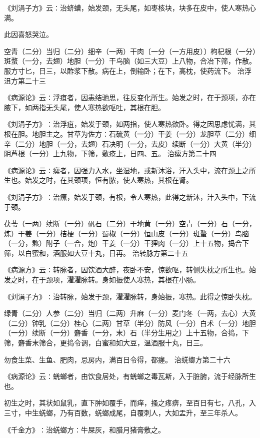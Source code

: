 \documentclass[a4paper,12pt,UTF8,twoside]{ctexbook}
\begin{document}
《刘涓子方》云∶治蛴螬，始发颈，无头尾，如枣核块，块多在皮中，使人寒热心满。

此因喜怒哭泣。

空青（二分）当归（二分）细辛（一两）干肉〔一分（一方用皮）〕枸杞根（一分）斑蝥（一分，去翅）地胆（一分）干鸟脑（如三大豆）上八物，合冶下筛，作散。服方寸匕，日三，以酢浆下散。病在上，倒输卧；在下，高枕，使药流下。
治浮沮方第二十三

《病源论》云∶浮疽者，因恚结驰思，往反变化所生。始发之时，在于颈项，亦在腋下，如两指无头尾，使人寒热欲呕吐，其根在胆。

《刘涓子方》∶治浮疽，始发于颈，如两指，使人寒热欲卧。得之因思虑忧满，其根在胆。地胆主之。甘草为佐方∶石硫黄（一分）干姜（一分）龙胆草（二分）细辛（二分）地胆（一分，去翅）石决明（一分，去皮）续断（一分）大黄（半分）阴芦根（一分）上九物，下筛，敷疮上，日四、五。
治瘰方第二十四

《病源论》云∶瘰者，因强力入水，坐湿地，或新沐浴，汗入头中，流在颈上之所生也。始发之时，在其颈项，恒有脓，使人寒热，其根在肾。

《刘涓子方》∶治瘰，始发于颈，有根，令人寒热，此得之新沐，汁入头中，下流于颈。

茯苓（一两）续断（一分）矾石（二分）干地黄（一分）空青（一分）石（一分，炼）干姜（一分）桔梗（一分）蜀椒（一分）恒山皮（一分）斑蝥（一分）鸟脑（一分，熬）附子（一合，炮）干姜（一分）干狸肉（一分）上十五物，捣合下筛，以白蜜和，酒服如大豆十丸，日再。
治转脉方第二十五

《病源方》云∶转脉者，因饮酒大醉，夜卧不安，惊欲呕，转侧失枕之所生也。始发之时，在于颈项，濯濯脉转。身如振使人寒热，其根在小肠。

《刘涓子方》∶治转脉，始发于颈，濯濯脉转，身始振，寒热。此得之惊卧失枕。

绿青（二分）人参（二分）当归（二两）升麻（一分）麦门冬（一两，去心）大黄（二分）钟乳（二分）桂心（二两）甘草（半分）防风（一分）白术（一分）地胆（一分）续断（一分）麝香（一分，末）石（半分生用之）上十五物，合捣，下筛，麝香末筛合，更捣令调，白蜜和如大豆，温酒服十丸，日三。

勿食生菜、生鱼、肥肉，忌房内，满百日令得，都瘥。
治蜣螂方第二十六

《病源论》云∶蜣螂者，由饮食居处，有蜣螂之毒瓦斯，入于脏腑，流于经脉所生也。

初生之时，其状如鼠乳，直下肿如覆手，而痒，搔之疼痹，至百日有七，八孔，入三寸，中生蜣螂，乃有百数，蜣螂成尾，自覆刺人，大如盂升，至三年杀人。

《千金方》∶治蜣螂方∶牛屎灰，和腊月猪膏敷之。
\end{document}
